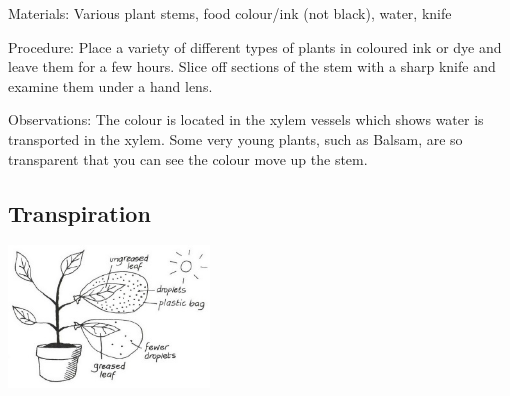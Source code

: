 \begin{multicols}{2}
\begin{description*}
\item[Materials:]{Various plant stems, food colour/ink (not black), water, knife}
\item[Procedure:]{Place a variety of different types of plants in coloured ink or dye and
leave them for a few hours. Slice off sections of the stem with a sharp
knife and examine them under a hand lens. }
\item[Observations:]{The colour is located in the
xylem vessels which shows water is transported in the xylem. Some very young plants, such as
Balsam, are so transparent that
you can see the colour move up
the stem.}
\end{description*}

\subsection{Transpiration} %

\begin{center}
\includegraphics[width=0.4\textwidth]{./img/vso/transpiration.jpg}
\end{center}


\end{multicols}
